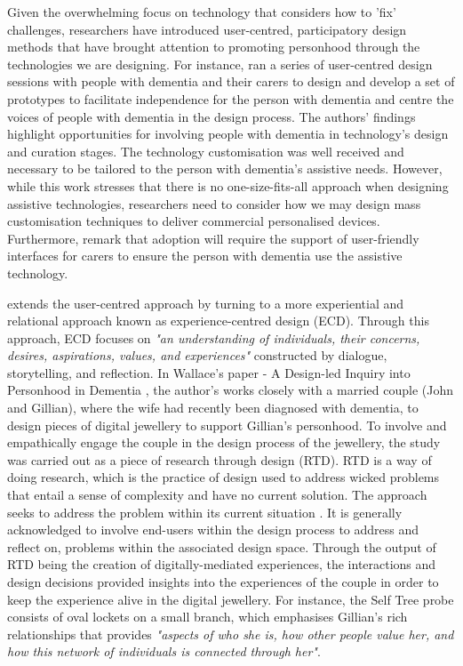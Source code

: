 Given the overwhelming focus on technology that considers how to 'fix' challenges, researchers have introduced user-centred, participatory design methods that have brought attention to promoting personhood through the technologies we are designing. For instance, \cite{robinson2009keeping} ran a series of user-centred design sessions with people with dementia and their carers to design and develop a set of prototypes to facilitate independence for the person with dementia and centre the voices of people with dementia in the design process. The authors' findings highlight opportunities for involving people with dementia in technology's design and curation stages. The technology customisation was well received and necessary to be tailored to the person with dementia's assistive needs. However, while this work stresses that there is no one-size-fits-all approach when designing assistive technologies, researchers need to consider how we may design mass customisation techniques to deliver commercial personalised devices. Furthermore, \cite{robinson2009keeping} remark that adoption will require the support of user-friendly interfaces for carers to ensure the person with dementia use the assistive technology. 

\cite{wallace_design-led_2013} extends the user-centred approach by turning to a more experiential and relational approach known as experience-centred design (ECD). Through this approach, ECD focuses on \textit{"an understanding of individuals, their concerns, desires, aspirations, values, and experiences"} \citep{morrissey_value_2017} constructed by dialogue, storytelling, and reflection. In Wallace's paper - A Design-led Inquiry into Personhood in Dementia \citep{wallace_design-led_2013}, the author's works closely with a married couple (John and Gillian), where the wife had recently been diagnosed with dementia, to design pieces of digital jewellery to support Gillian's personhood. To involve and empathically engage the couple in the design process of the jewellery, the study was carried out as a piece of research through design (RTD). RTD is a way of doing research, which is the practice of design used to address wicked problems that entail a sense of complexity and have no current solution. The approach seeks to address the problem within its current situation \citep{zimmerman_research_2007}. It is generally acknowledged to involve end-users within the design process to address and reflect on, problems within the associated design space. Through the output of RTD being the creation of digitally-mediated experiences, the interactions and design decisions provided \cite{wallace_design-led_2013} insights into the experiences of the couple in order to keep the experience alive in the digital jewellery. For instance, the Self Tree probe consists of oval lockets on a small branch, which emphasises Gillian's rich relationships that provides \textit{"aspects of who she is, how other people value her, and how this network of individuals is connected through her"}.

